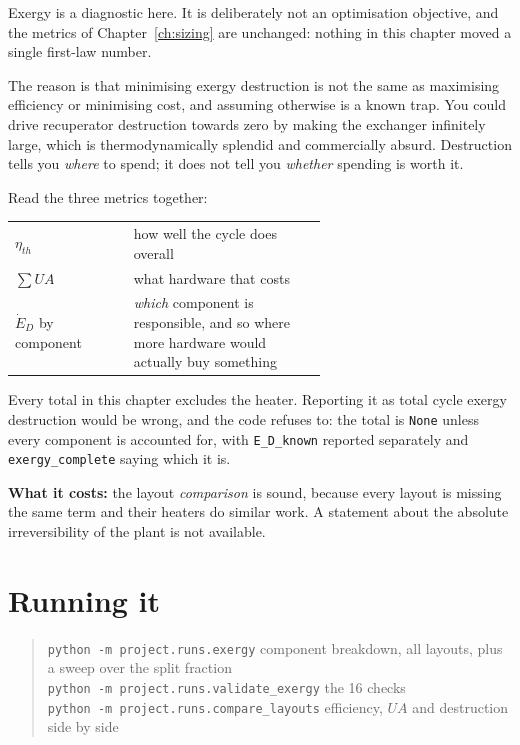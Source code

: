 \documentclass[11pt,a4paper]{report}
\newcommand{\code}[1]{\texttt{\small #1}}
\begin{document}
Exergy is a diagnostic here. It is deliberately not an optimisation
objective, and the metrics of Chapter~\ref{ch:sizing} are unchanged: nothing
in this chapter moved a single first-law number.

The reason is that minimising exergy destruction is not the same as
maximising efficiency or minimising cost, and assuming otherwise is a known
trap. You could drive recuperator destruction towards zero by making the
exchanger infinitely large, which is thermodynamically splendid and
commercially absurd. Destruction tells you \emph{where} to spend; it does
not tell you \emph{whether} spending is worth it.

Read the three metrics together:

\begin{center}
\begin{tabular}{@{}lp{0.62\linewidth}@{}}
\toprule
$\eta_{th}$ & how well the cycle does overall \\
$\sum UA$ & what hardware that costs \\
$\dot E_D$ by component & \emph{which} component is responsible, and so
  where more hardware would actually buy something \\
\bottomrule
\end{tabular}
\end{center}

\begin{caveat}[title={Caveat: the total is incomplete and should be labelled so}]
Every total in this chapter excludes the heater. Reporting it as total cycle
exergy destruction would be wrong, and the code refuses to: the total is
\code{None} unless every component is accounted for, with
\code{E\_D\_known} reported separately and \code{exergy\_complete} saying
which it is.

\textbf{What it costs:} the layout \emph{comparison} is sound, because every
layout is missing the same term and their heaters do similar work.
A statement about the absolute irreversibility of the plant is not available.
\end{caveat}

\section{Running it}

\begin{quote}\small
\code{python -m project.runs.exergy} \quad component breakdown, all layouts,
plus a sweep over the split fraction\\
\code{python -m project.runs.validate\_exergy} \quad the 16 checks\\
\code{python -m project.runs.compare\_layouts} \quad efficiency, $UA$ and
destruction side by side
\end{quote}
\end{document}
